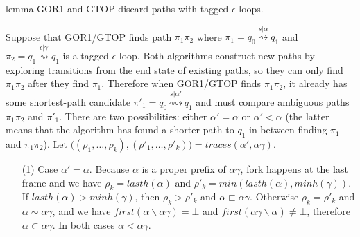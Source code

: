 \documentclass[AMA,STIX1COL]{WileyNJD-v2}
\begin{document}
\begin{theoremEnd}[restate, no link to proof, no link to theorem, category=lemmata_closure]{lemma}
    \label{lemma_closure_noloop}
    GOR1 and GTOP discard paths with tagged $\epsilon$-loops.
\end{theoremEnd}
\begin{proofEnd}
    Suppose that GOR1/GTOP finds path $\pi_1 \pi_2$
    where $\pi_1 = q_0 \overset {s | \alpha} {\rightsquigarrow} q_1$
    and $\pi_2 = q_1 \overset {\epsilon | \gamma} {\rightsquigarrow} q_1$ is a tagged $\epsilon$-loop.
    Both algorithms construct new paths by exploring transitions from the end state of existing paths,
    so they can only find $\pi_1 \pi_2$ after they find $\pi_1$.
    Therefore when GOR1/GTOP finds $\pi_1 \pi_2$,
    it already has some shortest-path candidate $\pi'_1 = q_0 \overset {s | \alpha'} {\rightsquigarrow} q_1$
    and must compare ambiguous paths $\pi_1 \pi_2$ and $\pi'_1$.
    There are two possibilities: either $\alpha' = \alpha$
    or $\alpha' < \alpha$ (the latter means that the algorithm has found
    a shorter path to $q_1$ in between finding $\pi_1$ and $\pi_1 \pi_2$).
    Let $\big( (\rho_1, \hdots, \rho_k), (\rho'_1, \hdots, \rho'_k) \big) = traces (\alpha', \alpha \gamma)$.
    \begin{itemize}[itemsep=0.5em, topsep=0.5em]
    \item[(1)]
        Case $\alpha' = \alpha$.
        Because $\alpha$ is a proper prefix of $\alpha \gamma$,
        fork happens at the last frame and we have
        $\rho_k = lasth(\alpha)$ and
        $\rho'_k = min (lasth(\alpha), minh(\gamma))$.
        If $lasth(\alpha) > minh(\gamma)$, then $\rho_k > \rho'_k$ and $\alpha \sqsubset \alpha \gamma$.
        Otherwise $\rho_k = \rho'_k$ and $\alpha \sim \alpha \gamma$,
        and we have $first(\alpha \backslash \alpha \gamma) = \bot$ and $first(\alpha \gamma \backslash \alpha) \neq \bot$,
        therefore $\alpha \subset \alpha \gamma$.
        In both cases $\alpha < \alpha \gamma$.


\end{itemize}
\end{proofEnd}
\end{document}
